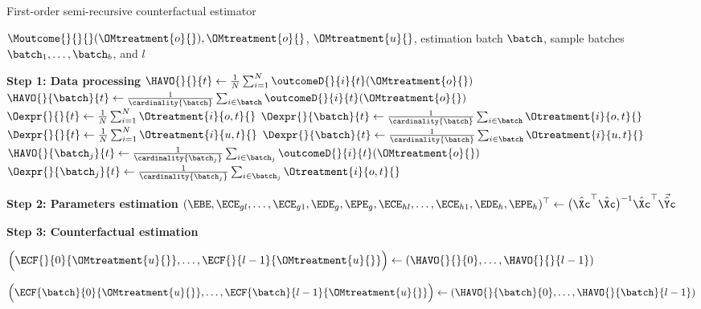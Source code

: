 % 
\begin{algorithm}
\caption{First-order semi-recursive counterfactual estimator}
\label{alg:FO-semi-recursive}
% 
\begin{algorithmic}
% 
\Require $\Moutcome{}{}{}(\OMtreatment{o}{}), \OMtreatment{o}{}$, $\OMtreatment{u}{}$, estimation batch $\batch$, sample batches $\batch_1, \ldots, \batch_b$, and $l$
% 

\State \hspace{-1.3em} \textbf{Step 1: Data processing}
% 
    \State $\HAVO{}{}{t}
        \gets
        \frac{1}{N} \sum_{i=1}^N \outcomeD{}{i}{t} (\OMtreatment{o}{})$
    \State $\HAVO{}{\batch}{t}
        \gets
        \frac{1}{\cardinality{\batch}} \sum_{i \in  \batch} \outcomeD{}{i}{t} (\OMtreatment{o}{})$
    \State $\Oexpr{}{}{t}
        \gets
        \frac{1}{N} \sum_{i=1}^N \Otreatment{i}{o,t}{}$
    \State $\Oexpr{}{\batch}{t}
        \gets
        \frac{1}{\cardinality{\batch}} \sum_{i \in  \batch} \Otreatment{i}{o,t}{}$
    \State $\Dexpr{}{}{t}
        \gets
        \frac{1}{N} \sum_{i=1}^N \Otreatment{i}{u,t}{}$
    \State $\Dexpr{}{\batch}{t}
        \gets
        \frac{1}{\cardinality{\batch}} \sum_{i \in  \batch} \Otreatment{i}{u,t}{}$
        \State $\HAVO{}{\batch_j}{t}
        \gets
        \frac{1}{\cardinality{\batch_j}} \sum_{i \in  \batch_j} \outcomeD{}{i}{t} (\OMtreatment{o}{})$
        \State $\Oexpr{}{\batch_j}{t}
        \gets
        \frac{1}{\cardinality{\batch_j}} \sum_{i \in  \batch_j} \Otreatment{i}{o,t}{}$
    \EndFor    
% 
\EndFor
% 

\State \hspace{-1.3em} \textbf{Step 2: Parameters estimation}
% 
\State $(\EBE, \ECE_{gl}, \ldots, \ECE_{g1}, \EDE_g, \EPE_g, \ECE_{hl}, \ldots, \ECE_{h1}, \EDE_h, \EPE_h)^\top \gets \big( \hat{\Xc}^\top \hat{\Xc} \big)^{-1} \hat{\Xc}^\top \Vec{\hat{\Yc}}$


\State \hspace{-1.3em} \textbf{Step 3: Counterfactual estimation}

\State $\Big(\ECF{}{0}{\OMtreatment{u}{}}, \ldots, \ECF{}{l-1}{\OMtreatment{u}{}} \Big) \gets \left(\HAVO{}{}{0}, \ldots, \HAVO{}{}{l-1} \right)$

\State $\Big(\ECF{\batch}{0}{\OMtreatment{u}{}}, \ldots, \ECF{\batch}{l-1}{\OMtreatment{u}{}} \Big) \gets \left(\HAVO{}{\batch}{0}, \ldots, \HAVO{}{\batch}{l-1} \right)$


\end{algorithmic}
\end{algorithm}
